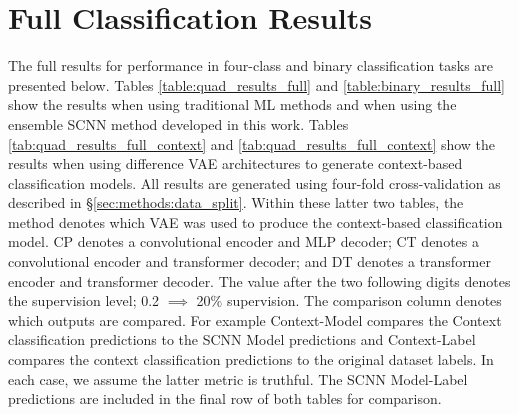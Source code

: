 \section{Full Classification Results}
The full results for performance in four-class and binary classification tasks are presented below. Tables \ref{table:quad_results_full} and \ref{table:binary_results_full} show the results when using traditional ML methods and when using the ensemble SCNN method developed in this work. Tables \ref{tab:quad_results_full_context} and \ref{tab:quad_results_full_context} show the results when using difference VAE architectures to generate context-based classification models. All results are generated using four-fold cross-validation as described in §\ref{sec:methods:data_split}. Within these latter two tables, the method denotes which VAE was used to produce the context-based classification model. CP denotes a convolutional encoder and MLP decoder; CT denotes a convolutional encoder and transformer decoder; and DT denotes a transformer encoder and transformer decoder. The value after the two following digits denotes the supervision level; 0.2 $\implies$ 20\% supervision. The comparison column denotes which outputs are compared. For example Context-Model compares the Context classification predictions to the SCNN Model predictions and Context-Label compares the context classification predictions to the original dataset labels. In each case, we assume the latter metric is truthful. The SCNN Model-Label predictions are included in the final row of both tables for comparison.

